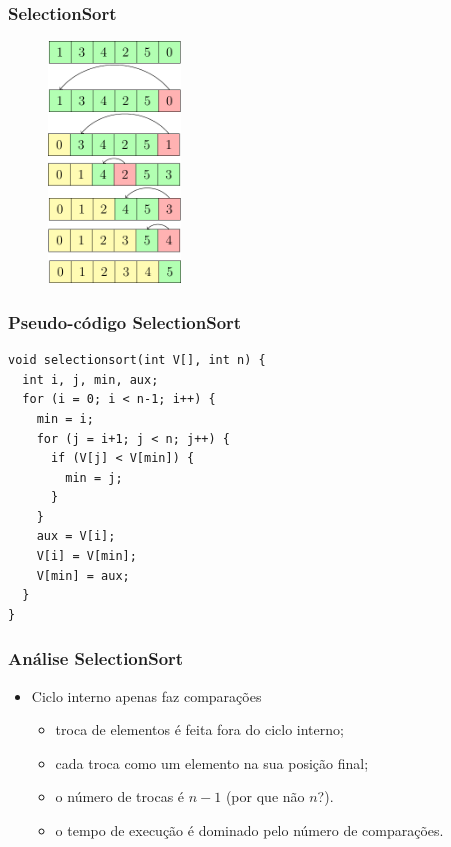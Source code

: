 \documentclass[aspectratio=169]{beamer}
\begin{document}
\begin{frame}
\frametitle{SelectionSort}
\begin{figure}[!h]
  \centering
  \includegraphics[width=100pt]{imgs/selectionsort.png}
  \label{fig_selectionsort}
\end{figure}
\end{frame}


\begin{frame}[fragile]
\frametitle{Pseudo-código SelectionSort}
\begin{lstlisting}
void selectionsort(int V[], int n) {
  int i, j, min, aux;  
  for (i = 0; i < n-1; i++) {
    min = i;
    for (j = i+1; j < n; j++) {
      if (V[j] < V[min]) {
        min = j;
      }
    }
    aux = V[i];
    V[i] = V[min];
    V[min] = aux;
  }
}
\end{lstlisting}

\end{frame}



\begin{frame}
\frametitle{Análise SelectionSort}
\begin{itemize}
 \item Ciclo interno apenas faz comparações
 \begin{itemize}
    \item troca de elementos é feita fora do ciclo interno;
    \item cada troca como um elemento na sua posição final;
    \item o número de trocas é $n-1$ (por que não $n$?).
    \item o tempo de execução é dominado pelo número de comparações.
 \end{itemize}
\end{itemize}

\end{frame}
\end{document}
